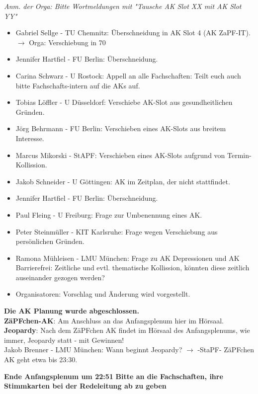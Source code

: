   \textit{Anm. der Orga: Bitte Wortmeldungen mit "Tausche AK Slot XX mit AK Slot YY"}
  \begin{itemize}
    \item Gabriel Sellge - TU Chemnitz:  Überschneidung in AK Slot 4 (AK ZaPF-IT). $\rightarrow$ Orga: Verschiebung in 70
    \item Jennifer Hartfiel - FU Berlin:  Überschneidung.
    \item Carina Schwarz - U Rostock:  Appell an alle Fachschaften: Teilt euch auch bitte Fachschafts-intern auf die AKs auf.
    \item Tobias Löffler - U Düsseldorf:  Verschiebe AK-Slot aus gesundheitlichen Gründen.
    \item Jörg Behrmann - FU Berlin:  Verschieben eines AK-Slots aus breitem Interesse.
    \item Marcus Mikorski - StAPF:  Verschieben eines AK-Slots aufgrund von Termin-Kollission.
    \item Jakob Schneider - U Göttingen:  AK im Zeitplan, der nicht stattfindet.
    \item Jennifer Hartfiel - FU Berlin:  Überschneidung.
    \item Paul Fleing - U Freiburg:  Frage zur Umbenennung eines AK.
    \item Peter Steinmüller - KIT Karlsruhe:  Frage wegen Verschiebung aus persönlichen Gründen.
    \item Ramona Mühleisen - LMU München:  Frage zu AK Depressionen und AK Barrierefrei: Zeitliche und evtl. thematische Kollission, könnten diese zeitlich auseinander gezogen werden?
    \item Organisatoren: Vorschlag und Änderung wird vorgestellt.
  \end{itemize}
  \textbf{Die AK Planung wurde abgeschlossen.} \\

  \textbf{ZäPFchen-AK}: Am Anschluss an das Anfangsplenum hier im Hörsaal. \\
  \textbf{Jeopardy}: Nach dem ZäPFchen AK findet im Hörsaal des Anfangsplenums, wie immer, Jeopardy statt - mit Gewinnen! \\
    Jakob Brenner - LMU München:  Wann beginnt Jeopardy? $\rightarrow$ -StaPF- ZäPFchen AK geht etwa bis 23:30. \\

\begin{center}
  \textbf{Ende Anfangsplenum um 22:51}
  \textbf{Bitte an die Fachschaften, ihre Stimmkarten bei der Redeleitung ab zu geben}
\end{center}
